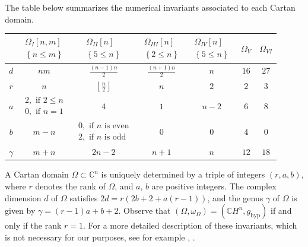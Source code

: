 \documentclass[reqno, 11pt]{amsart}
\begin{document}
The table below summarizes the numerical invariants associated to each Cartan domain.\begin{table}[h!]
    \centering
    \renewcommand{\arraystretch}{1.5}
    \begin{tabular}{|c|c|c|c|c|c|c|}
        \hline
         & {$\begin{array}{l}
        \Omega_I[n, m] \\[-0.2cm]
        \left\{n \leq m\right\}
        \end{array}$} & {$\begin{array}{l}
       \Omega_{II}[n] \\[-0.2cm]
        \left\{5 \leq n\right\}
        \end{array}$} & {$\begin{array}{l}
       \Omega_{III}[n] \\[-0.2cm]
        \left\{2 \leq n\right\}
        \end{array}$} &  {$\begin{array}{l}
       \Omega_{IV}[n] \\[-0.2cm]
        \left\{5 \leq n\right\}
        \end{array}$} & $\Omega_V$ & $\Omega_{VI}$ \\
        \hline
        $d$ & $nm$ & $\frac{(n-1)n}{2}$ & $\frac{(n+1)n}{2}$ & $n$ & $16$ & $27$ \\
        \hline
        $r$ & $n$ & $\left\lfloor \frac{n}{2} \right\rfloor$ & $n$ & $2$ & $2$ & $3$ \\
        \hline
        $a$ & {$\begin{array}{l}
        2, \text{ if } 2 \leq n \\[-0.2cm]
        0, \text{ if } n = 1
        \end{array}$} & $4$ & $1$ & $n-2$ & $6$ & $8$ \\
         \hline
        $b$ & $m-n$ &{$\begin{array}{l}
        0, \text{ if } n \text{ is even} \\[-0.2cm]
        2, \text{ if } n \text{ is odd }
        \end{array}$} & $0$ & $0$ & $4$ & $0$ \\
        \hline
        $\gamma$ & $m+n$ & $2n-2$ & $n+1$ & $n$ & $12$ & $18$ \\
        \hline
    \end{tabular}
\end{table}
\FloatBarrier
A Cartan domain \( \Omega \subset \mathbb{C}^n \) is uniquely determined by a triple of integers \( (r, a, b) \), where \( r \) denotes the rank of \( \Omega \), and \( a \), \( b \) are positive integers. The complex dimension \( d \) of \( \Omega \) satisfies \( 2d = r(2b + 2 + a(r - 1)) \), and the genus \( \gamma \) of \( \Omega \) is given by \( \gamma = (r - 1)a + b + 2 \). Observe that \( (\Omega, \omega_{\Omega}) = (\mathbb{C}H^n, g_{\text{hyp}}) \) if and only if the rank \( r = 1 \).
For a more detailed description of these invariants, which is not necessary for our purposes, see for example \cite{ARAZYbookAsurveyOfInvariant}, \cite{ZHANG1997ConstantOfBSD}.
\end{document}
